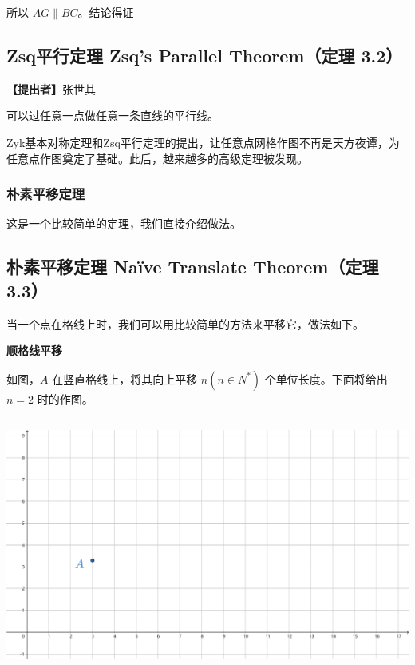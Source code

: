 \documentclass[UTF8]{article}
\begin{document}
所以 \(AG \parallel BC\)。结论得证

\hypertarget{zsqux5e73ux884cux5b9aux7406-zsqs-parallel-theoremux5b9aux7406-3.2}{%
\subsection{Zsq平行定理 Zsq's Parallel Theorem（定理
3.2）}\label{zsqux5e73ux884cux5b9aux7406-zsqs-parallel-theoremux5b9aux7406-3.2}}

\textbf{【提出者】}张世其

可以过任意一点做任意一条直线的平行线。

Zyk基本对称定理和Zsq平行定理的提出，让任意点网格作图不再是天方夜谭，为任意点作图奠定了基础。此后，越来越多的高级定理被发现。

\hypertarget{ux6734ux7d20ux5e73ux79fbux5b9aux7406}{%
\subsubsection{朴素平移定理}\label{ux6734ux7d20ux5e73ux79fbux5b9aux7406}}

这是一个比较简单的定理，我们直接介绍做法。

\hypertarget{ux6734ux7d20ux5e73ux79fbux5b9aux7406-nauxefve-translate-theoremux5b9aux7406-3.3}{%
\subsection{朴素平移定理 Naïve Translate Theorem（定理
3.3）}\label{ux6734ux7d20ux5e73ux79fbux5b9aux7406-nauxefve-translate-theoremux5b9aux7406-3.3}}

当一个点在格线上时，我们可以用比较简单的方法来平移它，做法如下。

\textbf{顺格线平移}

如图，\(A\) 在竖直格线上，将其向上平移 \(n\left( n \in N^{*} \right)\)
个单位长度。下面将给出 \(n = 2\) 时的作图。

\includegraphics[width=5.76806in,height=3.27847in]{media/image14.png}
\end{document}
